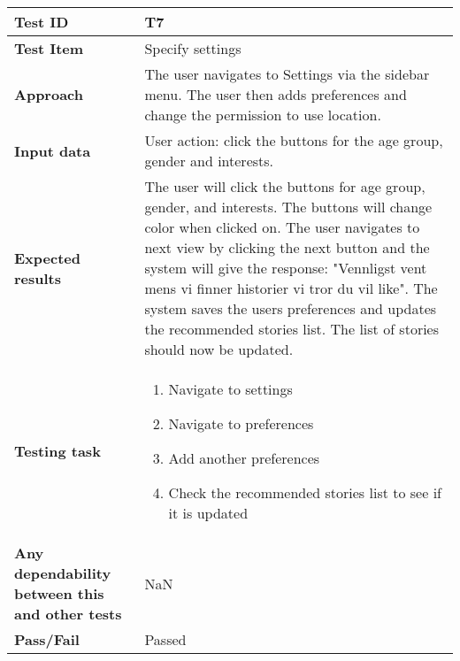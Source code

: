 \begin{center}
	\begin{table}[H]
		\begin{tabular}{ | p{4cm} | p{12cm}  |}
			\hline
			\textbf{Test ID} & T7  \\ \hline
			\textbf{Test Item} & Specify settings \\ \hline
			\textbf{Approach} & The user navigates to Settings via the sidebar menu. The user then adds preferences and change the permission to use location. \\ \hline		
			\textbf{Input data} &  User action: click the buttons for the age group, gender and interests. \\ \hline
			\textbf{Expected results} &  The user will click the buttons for age group, gender, and interests. The buttons will change color when clicked on. The user navigates to next view by clicking the next button and the system will give the response: "Vennligst vent mens vi finner historier vi tror du vil like". 
			The system saves the users preferences and updates the recommended stories list. The list of stories should now be updated.  \\ \hline
			\textbf{Testing task} & 
			\begin{enumerate}[noitemsep]
				\item Navigate to settings
				\item Navigate to preferences
				\item Add another preferences
				\item Check the recommended stories list to see if it is updated

			\end{enumerate}
			\\ \hline
			\textbf{Any dependability between this and other tests} & NaN \\ \hline		
			\textbf{Pass/Fail} & Passed \\\hline			
		\end{tabular}

	\caption{}
	\label{Tab_systemTesting7}
	\end{table}
\end{center}



\cleardoublepage